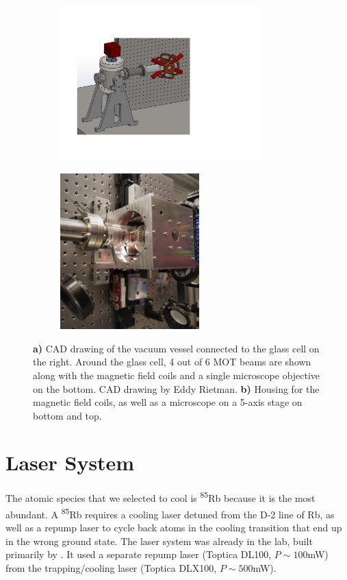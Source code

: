 \begin{figure}
	\begin{subfigure}{.54\linewidth}
		\centering
		\includegraphics[height=6cm]{figures/Vacuum.pdf}
		\caption{}
		\label{fig:VacuumSetup}
	\end{subfigure}
	\hfill
	\begin{subfigure}{.44\linewidth}
		\centering
		\includegraphics[height=6cm]{figures/Coils.jpg}
		\caption{}
		\label{fig:CoilsSetup}
	\end{subfigure}
	\caption{\textbf{a)} CAD drawing of the vacuum vessel connected to the glass cell on the right. 
	Around the glass cell, 4 out of 6 MOT beams are shown along with the magnetic field coils and a single microscope objective on the bottom. 
	CAD drawing by Eddy Rietman.
	\textbf{b)} Housing for the magnetic field coils, as well as a microscope on a 5-axis stage on bottom and top.}
\end{figure}



\section{Laser System}\label{sec:LaserSystem}

The atomic species that we selected to cool is \textsuperscript{85}Rb because it is the most abundant.
A \textsuperscript{85}Rb requires a cooling laser detuned from the D-2 line of Rb, as well as a repump laser to cycle back atoms in the cooling transition that end up in the wrong ground state.
The laser system was already in the lab, built primarily by \cite{Reijnders2010}.
It used a separate repump laser (Toptica DL100, $P \sim 100$mW) from the trapping/cooling laser (Toptica DLX100, $P \sim 500$mW). 


